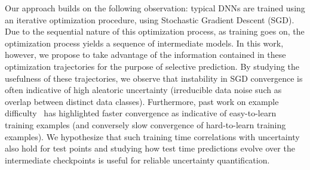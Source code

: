 Our approach builds on the following observation: typical DNNs are trained using an iterative optimization procedure, \eg using Stochastic Gradient Descent (SGD). Due to the sequential nature of this optimization process, as training goes on, the optimization process yields a sequence of intermediate models. 
In this work, however, we propose to take advantage of the information contained in these optimization trajectories for the purpose of selective prediction. By studying the usefulness of these trajectories, we observe that instability in SGD convergence is often indicative of high aleatoric uncertainty (\ie irreducible data noise such as overlap between distinct data classes). %
Furthermore, past work on example difficulty~\citep{jiang2020characterizing,toneva2018empirical,hooker2019compressed,agarwal2020estimating} has highlighted faster convergence as indicative of easy-to-learn training examples (and conversely slow convergence of hard-to-learn training examples). We hypothesize that such training time correlations with uncertainty also hold for test points and studying how test time predictions evolve over the intermediate checkpoints is useful for reliable uncertainty quantification.


